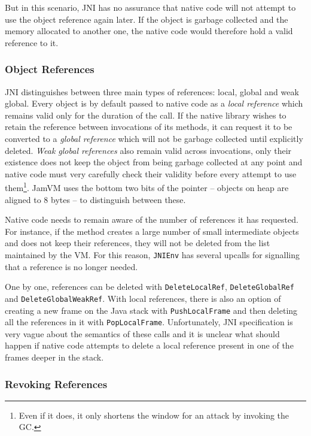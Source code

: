 \documentclass[a4paper,12pt,twoside,openright]{report}
\begin{document}
But in this scenario, JNI has no assurance that native code will not attempt to use the object reference again later. If the object is garbage collected and the memory allocated to another one, the native code would therefore hold a valid reference to it.

\subsubsection{Object References}
\label{sec:LocalAndGlobalRefs}

JNI distinguishes between three main types of references: local, global and weak global. Every object is by default passed to native code as a \emph{local reference} which remains valid only for the duration of the call. If the native library wishes to retain the reference between invocations of its methods, it can request it to be converted to a \emph{global reference} which will not be garbage collected until explicitly deleted. \emph{Weak global references} also remain valid across invocations, only their existence does not keep the object from being garbage collected at any point and native code must very carefully check their validity before every attempt to use them\footnote{Even if it does, it only shortens the window for an attack by invoking the GC.}. JamVM uses the bottom two bits of the pointer -- objects on heap are aligned to 8 bytes -- to distinguish between these.

Native code needs to remain aware of the number of references it has requested. For instance, if the method creates a large number of small intermediate objects and does not keep their references, they will not be deleted from the list maintained by the VM. For this reason, \texttt{JNIEnv} has several upcalls for signalling that a reference is no longer needed. 

One by one, references can be deleted with \texttt{DeleteLocalRef}, \texttt{DeleteGlobalRef} and \texttt{DeleteGlobalWeakRef}. With local references, there is also an option of creating a new frame on the Java stack with \texttt{PushLocalFrame} and then deleting all the references in it with \texttt{PopLocalFrame}. Unfortunately, JNI specification is very vague about the semantics of these calls and it is unclear what should happen if native code attempts to delete a local reference present in one of the frames deeper in the stack.

\subsubsection{Revoking References}
\end{document}

